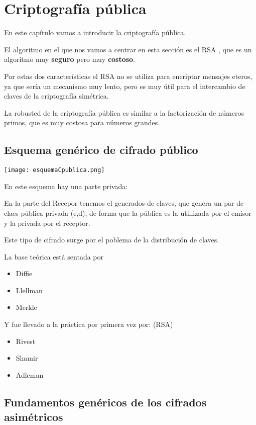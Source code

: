 \chapter{Criptografía pública}
En este capítulo vamos  a introducir la criptografía pública.

El algoritmo en el que nos vamos a centrar en esta sección es el RSA , que es un algoritmo muy \textbf{seguro} pero muy \textbf{costoso}.

Por estas dos características el RSA no se utiliza para encriptar mensajes eteros, ya que sería un mecanismo muy lento, pero es muy útil para el intercambio de claves de la criptografía simétrica.

La robusted de la criptografía pública es similar a la factorización de números primos, que es muy costosa para números grandes.
\section{Esquema genérico de cifrado público}
\begin{center}
	\texttt{[image: esquemaCpublica.png]}
\end{center}



En este esquema hay una parte privada:

En la parte del Recepor tenemos el generados de claves, que genera un par de claes pública privada (e,d), de forma que la pública es la utillizada por el emisor y la privada por el receptor.

Este tipo de cifrado surge por el poblema de la distribución de claves.

La base teórica está sentada por \begin{itemize}
	\item Diffie
	\item Llellman
	\item Merkle
\end{itemize}

Y fue llevado a la práctica por primera vez por: (RSA)
\begin{itemize}
	\item Rivest
	\item Shamir
	\item Adleman
\end{itemize}

\section{Fundamentos genéricos de los cifrados asimétricos}

